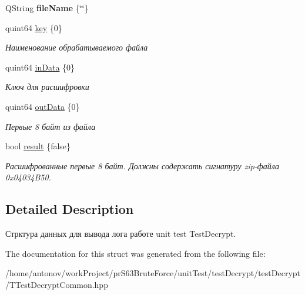 \begin{DoxyCompactItemize}
\item 
\mbox{\label{structunit_test_1_1test_decrypt_log_data_aff0a968167d10d4f1cd69356764a20b0}} 
Q\+String {\bfseries file\+Name} \{\char`\"{}\char`\"{}\}
\item 
\mbox{\label{structunit_test_1_1test_decrypt_log_data_afae12cc917bc6d246d26238116e03e1a}} 
quint64 \hyperlink{structunit_test_1_1test_decrypt_log_data_afae12cc917bc6d246d26238116e03e1a}{key} \{0\}
\begin{DoxyCompactList}\small\item\em Наименование обрабатываемого файла \end{DoxyCompactList}\item 
\mbox{\label{structunit_test_1_1test_decrypt_log_data_a79efdae0572ed3181179ee2e1e5a50dc}} 
quint64 \hyperlink{structunit_test_1_1test_decrypt_log_data_a79efdae0572ed3181179ee2e1e5a50dc}{in\+Data} \{0\}
\begin{DoxyCompactList}\small\item\em Ключ для расшифровки \end{DoxyCompactList}\item 
\mbox{\label{structunit_test_1_1test_decrypt_log_data_ace91a20a8172294e6d4ec7380818563a}} 
quint64 \hyperlink{structunit_test_1_1test_decrypt_log_data_ace91a20a8172294e6d4ec7380818563a}{out\+Data} \{0\}
\begin{DoxyCompactList}\small\item\em Первые 8 байт из файла \end{DoxyCompactList}\item 
\mbox{\label{structunit_test_1_1test_decrypt_log_data_a718d2f0eb7b48ff06d0c07705da28db4}} 
bool \hyperlink{structunit_test_1_1test_decrypt_log_data_a718d2f0eb7b48ff06d0c07705da28db4}{result} \{false\}
\begin{DoxyCompactList}\small\item\em Расшифрованные первые 8 байт. Должны содержать сигнатуру zip-\/файла 0x04034\+B50. \end{DoxyCompactList}\end{DoxyCompactItemize}


\subsection{Detailed Description}
Стрктура данных для вывода лога работе unit test Test\+Decrypt. 

The documentation for this struct was generated from the following file\+:\begin{DoxyCompactItemize}
\item 
/home/antonov/work\+Project/pr\+S63\+Brute\+Force/unit\+Test/test\+Decrypt/test\+Decrypt/T\+Test\+Decrypt\+Common.\+hpp\end{DoxyCompactItemize}
